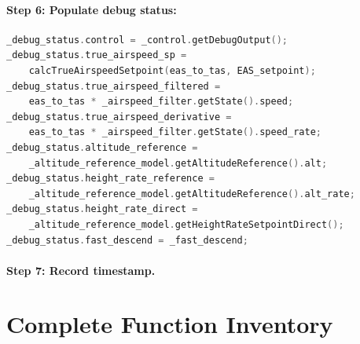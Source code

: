 \documentclass[12pt,a4paper]{article}
\begin{document}
\paragraph{Step 6: Populate debug status:}


\begin{lstlisting}[language=C++]
_debug_status.control = _control.getDebugOutput();
_debug_status.true_airspeed_sp =
    calcTrueAirspeedSetpoint(eas_to_tas, EAS_setpoint);
_debug_status.true_airspeed_filtered =
    eas_to_tas * _airspeed_filter.getState().speed;
_debug_status.true_airspeed_derivative =
    eas_to_tas * _airspeed_filter.getState().speed_rate;
_debug_status.altitude_reference =
    _altitude_reference_model.getAltitudeReference().alt;
_debug_status.height_rate_reference =
    _altitude_reference_model.getAltitudeReference().alt_rate;
_debug_status.height_rate_direct =
    _altitude_reference_model.getHeightRateSetpointDirect();
_debug_status.fast_descend = _fast_descend;
\end{lstlisting}

\paragraph{Step 7: Record timestamp.}

\section{Complete Function Inventory}
\end{document}

